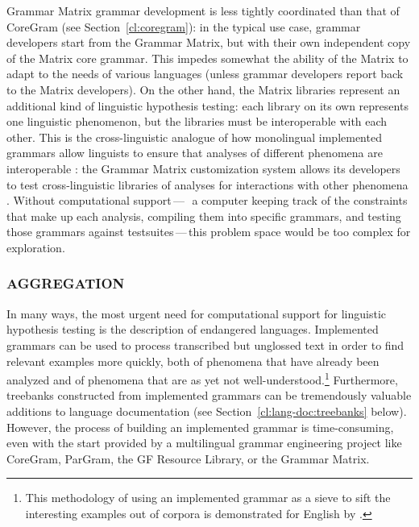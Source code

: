 \documentclass[output=paper,nonflat]{langsci/langscibook}
\begin{document}
Grammar Matrix grammar development is less tightly coordinated than
that of CoreGram (see Section~\ref{cl:coregram}): in the typical use case,
grammar developers start from the Grammar Matrix, but with their own
independent copy of the Matrix core grammar. This impedes somewhat the
ability of the Matrix to adapt to the needs of various languages
(unless grammar developers report back to the Matrix developers).  On
the other hand, the Matrix libraries represent an additional kind of
linguistic hypothesis testing: each library on its own represents one
linguistic phenomenon, but the libraries must be interoperable with
each other. This is the cross-linguistic analogue of how monolingual
implemented grammars allow linguists to ensure that analyses of
different phenomena are interoperable
\citep{Mueller99a,Bender2008c}: the Grammar Matrix customization
system allows its developers to test cross-linguistic libraries of
analyses for interactions with other phenomena
\citep{BFO2011a-u,Bender:16}. Without computational
support\,---\,\ie\ a computer keeping track of the constraints that
make up each analysis, compiling them into specific grammars, and
testing those grammars against testsuites\,---\,this problem space
would be too complex for exploration.

\subsubsection{AGGREGATION}
\label{cl:lang-doc:aggr}

In many ways, the most urgent need for computational support for
linguistic hypothesis testing is the description of endangered
languages. Implemented grammars can be used to process transcribed but
unglossed text in order to find relevant examples more quickly, both
of phenomena that have already been analyzed and of phenomena that are
as yet not well-understood.\footnote{This methodology of using an
  implemented grammar as a sieve to sift the interesting examples out
  of corpora is demonstrated for English by \cite{Baldwin-et-al-05}.}
Furthermore, treebanks constructed from implemented grammars can be
tremendously valuable additions to language documentation (see
Section~\ref{cl:lang-doc:treebanks} below). However, the process of building an
implemented grammar is time-consuming, even with the start provided by
a multilingual grammar engineering project like CoreGram, ParGram, the GF Resource Library, or the
Grammar Matrix.
\end{document}
